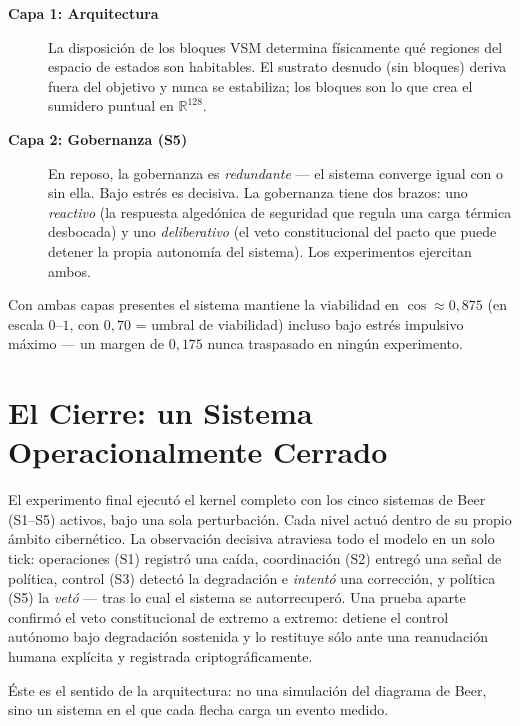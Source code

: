 \documentclass[11pt, a4paper]{article}
\newcommand{\R}{\mathbb{R}}
\begin{document}
\begin{description}
  \item[\textbf{Capa 1: Arquitectura}] La disposición de los bloques VSM determina
        físicamente qué regiones del espacio de estados son habitables. El sustrato
        desnudo (sin bloques) deriva fuera del objetivo y nunca se estabiliza; los
        bloques son lo que crea el sumidero puntual en $\R^{128}$.
  \item[\textbf{Capa 2: Gobernanza (S5)}] En reposo, la gobernanza es
        \emph{redundante} --- el sistema converge igual con o sin ella. Bajo estrés es
        decisiva. La gobernanza tiene dos brazos: uno \emph{reactivo} (la respuesta
        algedónica de seguridad que regula una carga térmica desbocada) y uno
        \emph{deliberativo} (el veto constitucional del pacto que puede detener la
        propia autonomía del sistema). Los experimentos ejercitan ambos.
\end{description}

Con ambas capas presentes el sistema mantiene la viabilidad en $\cos \approx 0{,}875$
(en escala $0$--$1$, con $0{,}70$ = umbral de viabilidad) incluso bajo estrés
impulsivo máximo --- un margen de $0{,}175$ nunca traspasado en ningún experimento.

\section*{El Cierre: un Sistema Operacionalmente Cerrado}

El experimento final ejecutó el kernel completo con los cinco sistemas de Beer
(S1--S5) activos, bajo una sola perturbación. Cada nivel actuó dentro de su propio
ámbito cibernético. La observación decisiva atraviesa todo el modelo en un solo tick:
operaciones (S1) registró una caída, coordinación (S2) entregó una señal de política,
control (S3) detectó la degradación e \emph{intentó} una corrección, y política (S5)
la \emph{vetó} --- tras lo cual el sistema se autorrecuperó. Una prueba aparte
confirmó el veto constitucional de extremo a extremo: detiene el control autónomo bajo
degradación sostenida y lo restituye sólo ante una reanudación humana explícita y
registrada criptográficamente.

Éste es el sentido de la arquitectura: no una simulación del diagrama de Beer, sino un
sistema en el que cada flecha carga un evento medido.

\end{document}
